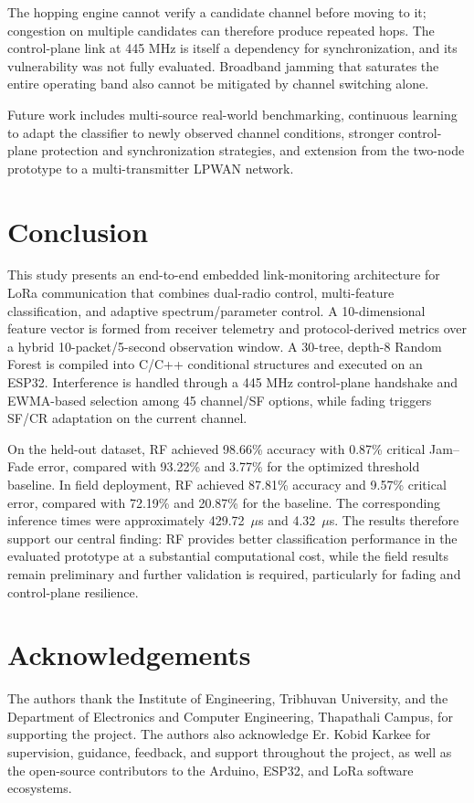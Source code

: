 \documentclass[10pt,a4paper]{article}
\begin{document}
The hopping engine cannot verify a candidate channel before moving to it; congestion on multiple candidates can therefore produce repeated hops. The control-plane link at 445 MHz is itself a dependency for synchronization, and its vulnerability was not fully evaluated. Broadband jamming that saturates the entire operating band also cannot be mitigated by channel switching alone.

Future work includes multi-source real-world benchmarking, continuous learning to adapt the classifier to newly observed channel conditions, stronger control-plane protection and synchronization strategies, and extension from the two-node prototype to a multi-transmitter LPWAN network.

\section{Conclusion}
This study presents an end-to-end embedded link-monitoring architecture for LoRa communication that combines dual-radio control, multi-feature classification, and adaptive spectrum/parameter control. A 10-dimensional feature vector is formed from receiver telemetry and protocol-derived metrics over a hybrid 10-packet/5-second observation window. A 30-tree, depth-8 Random Forest is compiled into C/C++ conditional structures and executed on an ESP32. Interference is handled through a 445 MHz control-plane handshake and EWMA-based selection among 45 channel/SF options, while fading triggers SF/CR adaptation on the current channel.

On the held-out dataset, RF achieved 98.66\% accuracy with 0.87\% critical Jam--Fade error, compared with 93.22\% and 3.77\% for the optimized threshold baseline. In field deployment, RF achieved 87.81\% accuracy and 9.57\% critical error, compared with 72.19\% and 20.87\% for the baseline. The corresponding inference times were approximately 429.72~$\mu$s and 4.32~$\mu$s. The results therefore support our central finding: RF provides better classification performance in the evaluated prototype at a substantial computational cost, while the field results remain preliminary and further validation is required, particularly for fading and control-plane resilience.

\section*{Acknowledgements}
The authors thank the Institute of Engineering, Tribhuvan University, and the Department of Electronics and Computer Engineering, Thapathali Campus, for supporting the project. The authors also acknowledge Er. Kobid Karkee for supervision, guidance, feedback, and support throughout the project, as well as the open-source contributors to the Arduino, ESP32, and LoRa software ecosystems.
\end{document}
